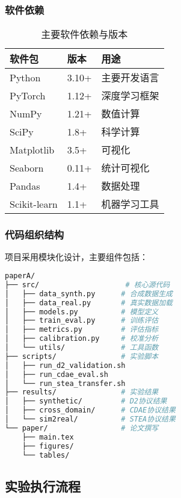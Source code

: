\subsubsection{软件依赖}
\begin{table}[h]
\centering
\caption{主要软件依赖与版本}
\label{tab:software_dependencies}
\begin{tabular}{@{}lll@{}}
\toprule
软件包 & 版本 & 用途 \\
\midrule
Python & 3.10+ & 主要开发语言 \\
PyTorch & 1.12+ & 深度学习框架 \\
NumPy & 1.21+ & 数值计算 \\
SciPy & 1.8+ & 科学计算 \\
Matplotlib & 3.5+ & 可视化 \\
Seaborn & 0.11+ & 统计可视化 \\
Pandas & 1.4+ & 数据处理 \\
Scikit-learn & 1.1+ & 机器学习工具 \\
\bottomrule
\end{tabular}
\end{table}

\subsubsection{代码组织结构}
项目采用模块化设计，主要组件包括：

\begin{lstlisting}[language=bash,caption=项目代码结构]
paperA/
├── src/                    # 核心源代码
│   ├── data_synth.py      # 合成数据生成
│   ├── data_real.py       # 真实数据加载
│   ├── models.py          # 模型定义
│   ├── train_eval.py      # 训练评估
│   ├── metrics.py         # 评估指标
│   ├── calibration.py     # 校准分析
│   └── utils/             # 工具函数
├── scripts/               # 实验脚本
│   ├── run_d2_validation.sh
│   ├── run_cdae_eval.sh
│   └── run_stea_transfer.sh
├── results/               # 实验结果
│   ├── synthetic/         # D2协议结果
│   ├── cross_domain/      # CDAE协议结果
│   └── sim2real/          # STEA协议结果
└── paper/                 # 论文撰写
    ├── main.tex
    ├── figures/
    └── tables/
\end{lstlisting}

\subsection{实验执行流程}
\label{subsec:execution_workflow}

